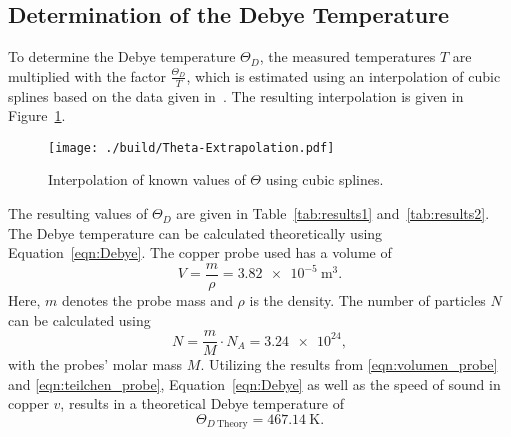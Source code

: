 \subsection{Determination of the Debye Temperature}
To determine the Debye temperature $\Theta_{D}$, the measured temperatures $T$ are multiplied with the factor $\frac{\Theta_{D}}{T}$, which is estimated
using an interpolation of cubic splines based on the data given in~\cite{V47}. The resulting interpolation is given in Figure~\ref{fig:interpol2}.
\begin{figure}[H]
	\centering
	\texttt{[image: ./build/Theta-Extrapolation.pdf]}
	\caption{Interpolation of known values of $\Theta$ using cubic splines.}
	\label{fig:interpol2}
\end{figure}
\noindent
The resulting values of $\Theta_{D}$ are given in Table~\ref{tab:results1} and~\ref{tab:results2}.
The Debye temperature can be calculated theoretically using Equation~\ref{eqn:Debye}. The copper probe used has a volume of
\begin{equation}
	V = \frac{m}{\rho} = \SI{3.82e-5}{\meter\cubed}.
	\label{eqn:volumen_probe}
\end{equation}
Here, $m$ denotes the probe mass and $\rho$ is the density.
The number of particles $N$ can be calculated using
\begin{equation}
	N = \frac{m}{M} \cdot N_{A} = \SI{3.24e24},
	\label{eqn:teilchen_probe}
\end{equation}
with the probes' molar mass $M$. Utilizing the results from \ref{eqn:volumen_probe} and \ref{eqn:teilchen_probe}, Equation~\ref{eqn:Debye} as well as
the speed of sound in copper $v$, results in a theoretical Debye temperature of
\begin{equation}
	\Theta_{D \ \mathrm{Theory}} = \SI{467.14}{\kelvin}.
	\label{eqn:Debye_Theorie}
\end{equation}
